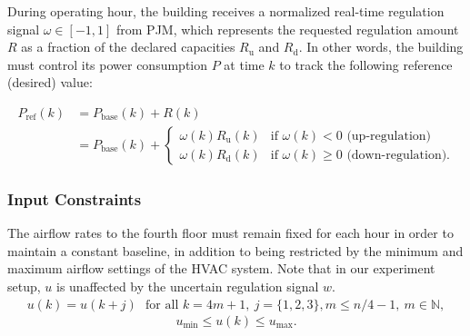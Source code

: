 During operating hour, the building receives a normalized real-time regulation signal $\omega \in [-1,1]$ from PJM, which represents the requested regulation amount $R$ as a fraction of the declared capacities $R_{\text{u}}$ and $R_{\text{d}}$. In other words, the building must control its power consumption $P$ at time $k$ to track the following reference (desired) value:

\begin{equation}\label{eq:P_ref}
\begin{aligned}
P_{\text{ref}}(k) &= P_{\text{base}}(k)+R(k) \\
	&= P_{\text{base}}(k)+\begin{cases}
	\omega(k) R_{\text{u}}(k) & \mbox{if } \omega(k) < 0 \mbox{ (up-regulation)} \\ 
	\omega(k) R_{\text{d}}(k) & \mbox{if } \omega(k) \geq 0 \mbox{ (down-regulation).} 
	\end{cases} 
\end{aligned}
\end{equation}



\subsubsection{Input Constraints}


The airflow rates to the fourth floor must remain fixed for each hour in order to maintain a constant baseline, in addition to being restricted by the minimum and maximum airflow settings of the HVAC system.
Note that in our experiment setup, $u$ is unaffected by the uncertain regulation signal $w$.
\begin{multline}\label{eq:u_constraint_const}
u(k) = u(k+j) \text{~~for all~} k = 4m+1,~ j = \{1,2,3\}, m \leq n/4-1, ~m \in \mathbb{N},
\end{multline}
\begin{equation}\label{eq:u_constraint}
u_{\text{min}} \leq u(k) \leq u_{\text{max}}.
\end{equation}

